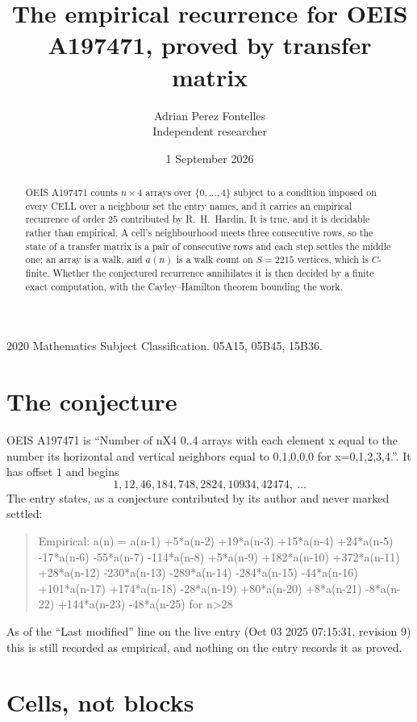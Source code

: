\documentclass[11pt,a4paper]{article}
\title{The empirical recurrence for OEIS A197471, proved by transfer matrix}
\author{Adrian Perez Fontelles\\ \small Independent researcher}
\date{1 September 2026}
\theoremstyle{plain}
\theoremstyle{definition}
\begin{document}
\maketitle

\begin{abstract}
OEIS A197471 counts $n\times4$ arrays over $\{0,\dots,4\}$ subject to a condition imposed on
every CELL over a neighbour set the entry names, and it carries an empirical recurrence of
order $25$ contributed by R.~H.~Hardin. It is true, and it is decidable rather than
empirical. A cell's neighbourhood meets three consecutive rows, so the state of a transfer
matrix is a pair of consecutive rows and each step settles the middle one; an array is a
walk, and $a(n)$ is a walk count on $S=2215$ vertices, which is $C$-finite. Whether the
conjectured recurrence annihilates it is then decided by a finite exact computation, with the
Cayley--Hamilton theorem bounding the work.
\end{abstract}

\noindent\small 2020 Mathematics Subject Classification. 05A15, 05B45, 15B36.\normalsize

\section{The conjecture}

OEIS A197471 is ``Number of nX4 0..4 arrays with each element x equal to the number its horizontal and vertical neighbors equal to 0,1,0,0,0 for x=0,1,2,3,4.''. It has offset $1$ and begins
\[
1, 12, 46, 184, 748, 2824, 10934, 42474,\ \dots
\]
The entry states, as a conjecture contributed by its author and never marked settled:
\begin{quote}
Empirical: a(n) = a(n-1) +5*a(n-2) +19*a(n-3) +15*a(n-4) +24*a(n-5) -17*a(n-6) -55*a(n-7) -114*a(n-8) +5*a(n-9) +182*a(n-10) +372*a(n-11) +28*a(n-12) -230*a(n-13) -289*a(n-14) -284*a(n-15) -44*a(n-16) +101*a(n-17) +174*a(n-18) -28*a(n-19) +80*a(n-20) +8*a(n-21) -8*a(n-22) +144*a(n-23) -48*a(n-25) for n>28
\end{quote}
As of the ``Last modified'' line on the live entry (Oct 03 2025 07:15:31, revision 9) this is still
recorded as empirical, and nothing on the entry records it as proved.

\section{Cells, not blocks}
\end{document}
